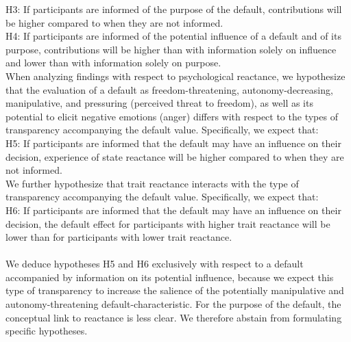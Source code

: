 \documentclass[review, authoryear,12pt]{elsarticle}
\begin{document}
H3: If participants are informed of the purpose of the default, contributions will be higher compared to when they are not informed. \\

H4: If participants are informed of the potential influence of a default and of its purpose, contributions will be higher than with information solely on influence and lower than with information solely on purpose. \\

When analyzing findings with respect to psychological reactance, we hypothesize that the evaluation of a default as freedom-threatening, autonomy-decreasing, manipulative, and pressuring (perceived threat to freedom), as well as its potential to elicit negative emotions (anger) differs with respect to the types of transparency accompanying the default value. Specifically, we expect that: \\

H5: If participants are informed that the default may have an influence on their decision, experience of state reactance will be higher compared to when they are not informed. \\

We further hypothesize that trait reactance interacts with the type of transparency accompanying the default value. Specifically, we expect that: \\

H6: If participants are informed that the default may have an influence on their decision, the default effect for participants with higher trait reactance will be lower than for participants with lower trait reactance. \\ \\


We deduce hypotheses H5 and H6 exclusively with respect to a default accompanied by information on its potential influence, because we expect this type of transparency to increase the salience of the potentially manipulative and autonomy-threatening default-characteristic. For the purpose of the default, the conceptual link to reactance is less clear. We therefore abstain from formulating specific hypotheses.
\end{document}
